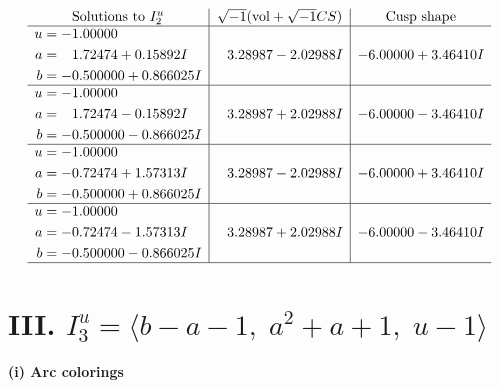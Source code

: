 \documentclass[1p]{elsarticle_modified}
\theoremstyle{definition}
\newcommand{\I}{\sqrt{-1}}
\begin{document}
$$\begin{array}{c|c|c}  
\text{Solutions to }I^u_{2}& \I (\text{vol} + \sqrt{-1}CS) & \text{Cusp shape}\\
 \hline 
\begin{aligned}
u &= -1.00000\phantom{ +0.000000I} \\
a &= \phantom{-}1.72474 + 0.15892 I \\
b &= -0.500000 + 0.866025 I\end{aligned}
 & \phantom{-}3.28987 - 2.02988 I & -6.00000 + 3.46410 I \\ \hline\begin{aligned}
u &= -1.00000\phantom{ +0.000000I} \\
a &= \phantom{-}1.72474 - 0.15892 I \\
b &= -0.500000 - 0.866025 I\end{aligned}
 & \phantom{-}3.28987 + 2.02988 I & -6.00000 - 3.46410 I \\ \hline\begin{aligned}
u &= -1.00000\phantom{ +0.000000I} \\
a &= -0.72474 + 1.57313 I \\
b &= -0.500000 + 0.866025 I\end{aligned}
 & \phantom{-}3.28987 - 2.02988 I & -6.00000 + 3.46410 I \\ \hline\begin{aligned}
u &= -1.00000\phantom{ +0.000000I} \\
a &= -0.72474 - 1.57313 I \\
b &= -0.500000 - 0.866025 I\end{aligned}
 & \phantom{-}3.28987 + 2.02988 I & -6.00000 - 3.46410 I\\
 \hline 
 \end{array}$$\newpage\newpage\renewcommand{\arraystretch}{1}
\centering \section*{III. $I^u_{3}= \langle b- a-1,\;a^2+a+1,\;u-1 \rangle$}
\flushleft \textbf{(i) Arc colorings}\\
\end{document}
